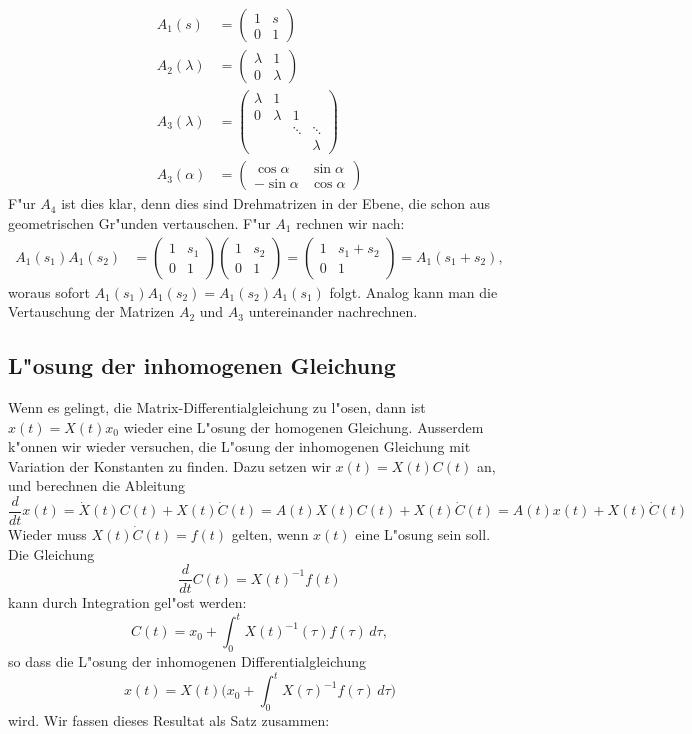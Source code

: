 \begin{align*}
A_1(s)&=\begin{pmatrix}1&s\\0&1\end{pmatrix}\\
A_2(\lambda)&=\begin{pmatrix}\lambda&1\\0&\lambda\end{pmatrix}\\
A_3(\lambda)&=\begin{pmatrix}\lambda&      1&      &       \\
                                   0&\lambda&     1&       \\
                                    &       &\ddots&\ddots \\
                                    &       &      &\lambda\end{pmatrix}\\
A_3(\alpha)&=\begin{pmatrix}\cos \alpha&\sin \alpha\\-\sin \alpha&\cos \alpha\end{pmatrix}
\end{align*}
F"ur $A_4$ ist dies klar, denn dies sind Drehmatrizen in der Ebene,
die schon aus geometrischen Gr"unden vertauschen.
%
F"ur $A_1$ rechnen wir nach:
\begin{align*}
A_1(s_1)A_1(s_2)
&=
\begin{pmatrix}1&s_1\\0&1\end{pmatrix}
\begin{pmatrix}1&s_2\\0&1\end{pmatrix}
=
\begin{pmatrix}1&s_1+s_2\\0&1\end{pmatrix}
=
A_1(s_1+s_2),
\end{align*}
woraus sofort
$
A_1(s_1)A_1(s_2)=
A_1(s_2)A_1(s_1)
$
folgt.
Analog kann man die Vertauschung der Matrizen $A_2$ und $A_3$ untereinander
nachrechnen.

\subsection{L"osung der inhomogenen Gleichung}
Wenn es gelingt, die Matrix-Differentialgleichung zu l"osen, dann
ist $x(t)=X(t)x_0$ wieder eine L"osung der homogenen Gleichung.
Ausserdem k"onnen wir wieder versuchen, die L"osung der inhomogenen
Gleichung mit Variation der Konstanten zu finden.
%
Dazu setzen wir $x(t)=X(t)C(t)$ an, und berechnen die Ableitung
\[
\frac{d}{dt}x(t)
=
\dot{X}(t)C(t)+X(t)\dot{C}(t)
=
A(t)X(t)C(t)+X(t)\dot{C}(t)
=
A(t)x(t)+X(t)\dot{C}(t)
\]
Wieder muss $X(t)\dot{C}(t)=f(t)$ gelten, wenn $x(t)$ eine L"osung sein
soll.
Die Gleichung
\[
\frac{d}{dt}C(t)
=
X(t)^{-1}f(t)
\]
kann durch Integration gel"ost werden:
\[
C(t)
=x_0+\int_0^t X(t)^{-1}(\tau)f(\tau)\,d\tau,
\]
so dass die L"osung der inhomogenen Differentialgleichung
\[
x(t)=X(t)\biggl(x_0+\int_0^t X(\tau)^{-1} f(\tau)\,d\tau\biggr)
\]
wird.
Wir fassen dieses Resultat als Satz zusammen:

